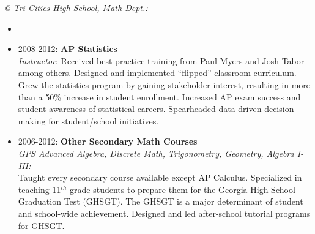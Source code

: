 \documentclass[paper=a4,fontsize=11pt]{scrartcl} %
\newcommand{\CourseEntry}[3]{
		\noindent \item{#1: \textbf{#2} \\ #3}}
\begin{document}
\noindent\textit{@ Tri-Cities High School, Math Dept.:}

\begin{itemize}
\item[]
\vspace{-24pt}

\CourseEntry{2008-2012}{AP Statistics}{\textit{Instructor}: Received best-practice training from Paul Myers and Josh Tabor among others. Designed and implemented ``flipped'' classroom curriculum. Grew the statistics program by gaining stakeholder interest, resulting in more than a 50\% increase in student enrollment. Increased AP exam success and student awareness of statistical careers. Spearheaded data-driven decision making for student/school initiatives.}
\CourseEntry{2006-2012}{Other Secondary Math Courses}{\textit{GPS Advanced Algebra, Discrete Math, Trigonometry, Geometry, Algebra I-III:} \\Taught every secondary course available except AP Calculus. Specialized in teaching 11$^{th}$ grade students to prepare them for the Georgia High School Graduation Test (GHSGT). The GHSGT is a major determinant of student and school-wide achievement. Designed and led after-school tutorial programs for GHSGT.}

\end{itemize}
\end{document}
